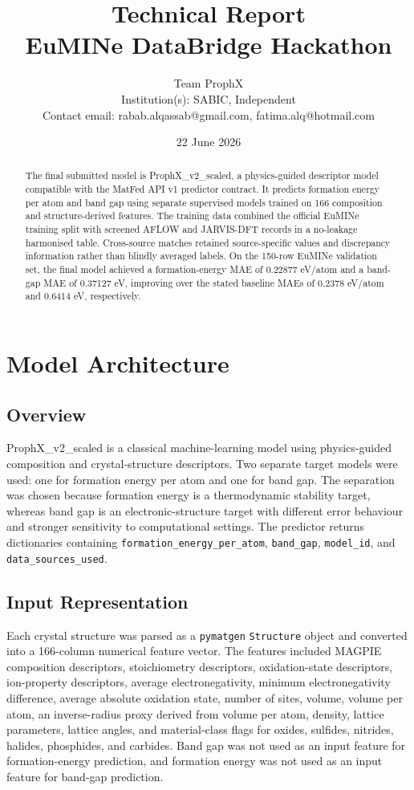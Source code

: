 \documentclass[10pt, a4paper]{article}
\title{%
  \textbf{Technical Report}\\[4pt]
  {\large EuMINe DataBridge Hackathon \hackathonyear}
}
\author{
  Team ProphX \\
  \small Institution(s): SABIC, Independent \\
  \small Contact email: rabab.alqassab@gmail.com, fatima.alq@hotmail.com
}
\date{22 June 2026}
\begin{document}
\maketitle
\thispagestyle{fancy}

\begin{abstract}
The final submitted model is ProphX\_v2\_scaled, a physics-guided descriptor model compatible with the MatFed API v1 predictor contract. It predicts formation energy per atom and band gap using separate supervised models trained on 166 composition and structure-derived features. The training data combined the official EuMINe training split with screened AFLOW and JARVIS-DFT records in a no-leakage harmonised table. Cross-source matches retained source-specific values and discrepancy information rather than blindly averaged labels. On the 150-row EuMINe validation set, the final model achieved a formation-energy MAE of 0.22877 eV/atom and a band-gap MAE of 0.37127 eV, improving over the stated baseline MAEs of 0.2378 eV/atom and 0.6414 eV, respectively.
\end{abstract}

\tableofcontents
\vspace{1em}

\section{Model Architecture}

\subsection{Overview}
ProphX\_v2\_scaled is a classical machine-learning model using physics-guided composition and crystal-structure descriptors. Two separate target models were used: one for formation energy per atom and one for band gap. The separation was chosen because formation energy is a thermodynamic stability target, whereas band gap is an electronic-structure target with different error behaviour and stronger sensitivity to computational settings. The predictor returns dictionaries containing \texttt{formation\_energy\_per\_atom}, \texttt{band\_gap}, \texttt{model\_id}, and \texttt{data\_sources\_used}.

\subsection{Input Representation}
Each crystal structure was parsed as a \texttt{pymatgen} \texttt{Structure} object and converted into a 166-column numerical feature vector. The features included MAGPIE composition descriptors, stoichiometry descriptors, oxidation-state descriptors, ion-property descriptors, average electronegativity, minimum electronegativity difference, average absolute oxidation state, number of sites, volume, volume per atom, an inverse-radius proxy derived from volume per atom, density, lattice parameters, lattice angles, and material-class flags for oxides, sulfides, nitrides, halides, phosphides, and carbides. Band gap was not used as an input feature for formation-energy prediction, and formation energy was not used as an input feature for band-gap prediction.
\end{document}
